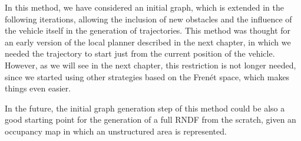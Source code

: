 In this method, we have considered an initial graph, which is extended in the following iterations, allowing the inclusion of new obstacles and the influence of the vehicle itself in the generation of trajectories. This method was thought for an early version of the local planner described in the next chapter, in which we needed the trajectory to start just from the current position of the vehicle. However, as we will see in the next chapter, this restriction is not longer needed, since we started using other strategies based on the Frenét space, which makes things even easier.

In the future, the initial graph generation step of this method could be also a good starting point for the generation of a full \ac{RNDF} from the scratch, given an occupancy map in which an unstructured area is represented.
